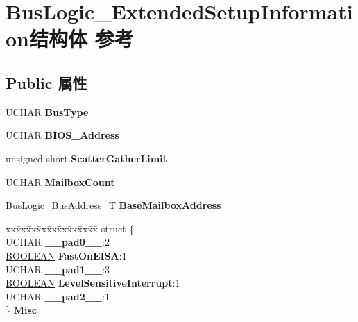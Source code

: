 \hypertarget{struct_bus_logic___extended_setup_information}{}\section{Bus\+Logic\+\_\+\+Extended\+Setup\+Information结构体 参考}
\label{struct_bus_logic___extended_setup_information}
\subsection*{Public 属性}
\begin{DoxyCompactItemize}
\item 
\mbox{\label{struct_bus_logic___extended_setup_information_a29af6aee4fdb2e25dfee32ccb074bd03}} 
U\+C\+H\+AR {\bfseries Bus\+Type}
\item 
\mbox{\label{struct_bus_logic___extended_setup_information_abe3ea3ea570f130ef1bd9e7252ad1ab2}} 
U\+C\+H\+AR {\bfseries B\+I\+O\+S\+\_\+\+Address}
\item 
\mbox{\label{struct_bus_logic___extended_setup_information_ae4dc517e17ecd675867aa3ae9dd99624}} 
unsigned short {\bfseries Scatter\+Gather\+Limit}
\item 
\mbox{\label{struct_bus_logic___extended_setup_information_a4ab7edd3f8147e98311efd10c31c83af}} 
U\+C\+H\+AR {\bfseries Mailbox\+Count}
\item 
\mbox{\label{struct_bus_logic___extended_setup_information_a518375f0592844b03d940ce0fa32d1ff}} 
Bus\+Logic\+\_\+\+Bus\+Address\+\_\+T {\bfseries Base\+Mailbox\+Address}
\item 
\mbox{\label{struct_bus_logic___extended_setup_information_add5abfba8d9b825545443f3b316afafe}} 
\begin{tabbing}
xx\=xx\=xx\=xx\=xx\=xx\=xx\=xx\=xx\=\kill
struct \{\\
\>UCHAR {\bfseries \_\_pad0\_\_}:2\\
\>\hyperlink{_processor_bind_8h_a112e3146cb38b6ee95e64d85842e380a}{BOOLEAN} {\bfseries FastOnEISA}:1\\
\>UCHAR {\bfseries \_\_pad1\_\_}:3\\
\>\hyperlink{_processor_bind_8h_a112e3146cb38b6ee95e64d85842e380a}{BOOLEAN} {\bfseries LevelSensitiveInterrupt}:1\\
\>UCHAR {\bfseries \_\_pad2\_\_}:1\\
\} {\bfseries Misc}\\


\end{tabbing}
\end{DoxyCompactItemize}
